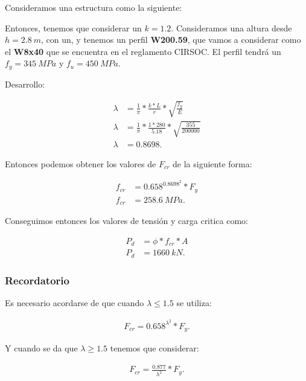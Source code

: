 \documentclass[../main.tex]{subfiles}
\begin{document}
Consideramos una estructura como la siguiente:




Entonces, tenemos que considerar un $k=1.2$. 
Consideramos una altura desde $h = \SI{2.8}{m}$, con un, y tenemos un perfil
\textbf{W200.59}, que vamos a considerar como el \textbf{W8x40} que se encuentra
en el reglamento CIRSOC. El perfil tendrá un $f_y = \SI{345}{MPa} $ y  
$f_u = \SI{450}{MPa}$.

Desarrollo:

\begin{align*}
  \lambda &= \frac{1}{\pi} * \frac{k*L}{r} * \sqrt{\frac{f_y}{E}} \\[5pt] 
  \lambda &=   \frac{1}{\pi} * \frac{1*280}{5.18} * \sqrt{\frac{355}{200000}} \\[5pt]
  \lambda &= 0.8698
.\end{align*}

Entonces podemos obtener los valores de $F_{cr}$ de la siguiente forma:

\begin{align*}
  f_{cr} &= 0.658^{0.8698^2} * F_y\\[5pt] 
  f_{cr} &= \SI{258.6}{MPa}
.\end{align*}

Conseguimos entonces los valores de tensión y carga critica como:

\begin{align*}
  P_d &= \phi * f_{cr} * A \\[5pt]
  P_d &= \SI{1660}{kN} 
.\end{align*}

\subsubsection{Recordatorio}

Es necesario acordarse de que cuando $\lambda\leq 1.5$ se utiliza:

\begin{align*}
  F_{cr} = 0.658^{\lambda^2}*F_y
.\end{align*}

Y cuando se da que $\lambda\geq 1.5$ tenemos que considerar:

\begin{align*}
  F_{cr} = \frac{0.877}{\lambda^2}*F_y
.\end{align*}
\end{document}
